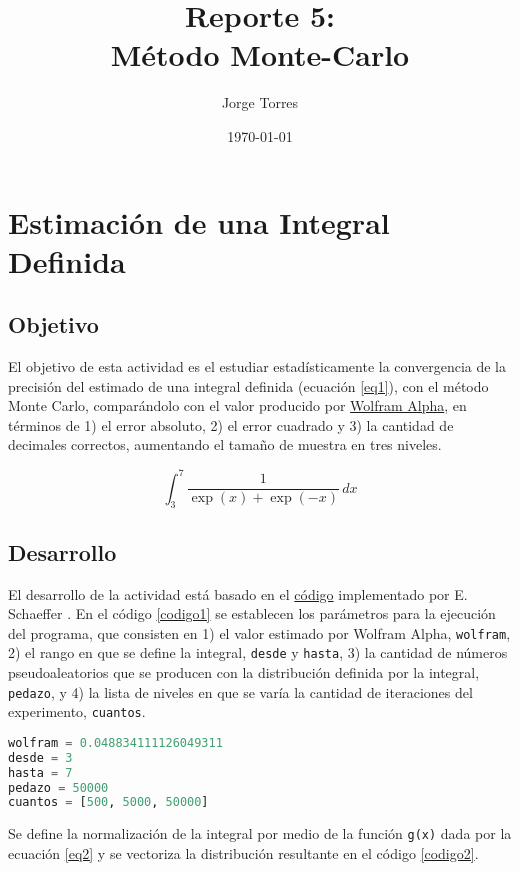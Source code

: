 \documentclass{report}
\title{Reporte 5:\\M\'etodo Monte-Carlo}
\author{Jorge Torres}
\date{\today}
\begin{document}
\maketitle

\chapter{Estimaci\'on de una Integral Definida}

\section{Objetivo}
El objetivo de esta actividad es el estudiar estadísticamente la convergencia de la precisión del estimado de una integral definida (ecuaci\'on \ref{eq1}), con el método Monte Carlo, compar\'andolo con el valor producido por \href{https://www.wolframalpha.com/input?i=integrate+1%2F%28exp%28x%29%2Bexp%28-x%29%29+from+3+to+7}{Wolfram Alpha}, en términos de 1) el error absoluto, 2) el error cuadrado y 3) la cantidad de decimales correctos, aumentando el tamaño de muestra en tres niveles.

\begin{equation}\label{eq1}
    \int_{3}^{7} \frac{1}{\exp{(x)} + \exp{(-x)}} \,dx
\end{equation}

\section{Desarrollo}
El desarrollo de la actividad est\'a basado en el \href{https://github.com/satuelisa/Simulation/blob/master/MonteCarlo/integral.py}{c\'odigo} implementado por E. Schaeffer \cite{elisa1}. En el c\'odigo \ref{codigo1} se establecen los par\'ametros para la ejecuci\'on del programa, que consisten en 1) el valor estimado por Wolfram Alpha, \texttt{wolfram}, 2) el rango en que se define la integral, \texttt{desde} y \texttt{hasta}, 3) la cantidad de n\'umeros pseudoaleatorios que se producen con la distribuci\'on definida por la integral, \texttt{pedazo}, y 4) la lista de niveles en que se var\'ia la cantidad de iteraciones del experimento, \texttt{cuantos}.

\begin{lstlisting}[caption=Par\'ametros, label=codigo1, language=Python]
wolfram = 0.048834111126049311
desde = 3
hasta = 7
pedazo = 50000
cuantos = [500, 5000, 50000]
\end{lstlisting}

Se define la normalizaci\'on de la integral por medio de la funci\'on \texttt{g(x)} dada por la ecuaci\'on \ref{eq2} y se vectoriza la distribuci\'on resultante en el c\'odigo \ref{codigo2}.
\end{document}
